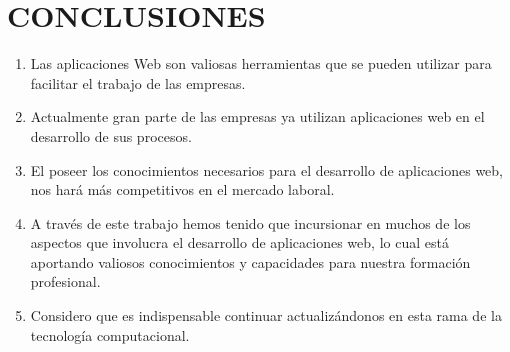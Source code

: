 \chapter*{CONCLUSIONES}
{
	\fontsize{12pt}{10mm}\selectfont
	\begin{enumerate}
		\item Las aplicaciones Web son valiosas herramientas que se pueden utilizar para facilitar el trabajo de las empresas.
		\vspace{6mm}
		
		\item Actualmente gran parte de las empresas ya utilizan aplicaciones web en el desarrollo de sus procesos.
		\vspace{6mm}
		
		\item El poseer los conocimientos necesarios para el desarrollo de aplicaciones web, nos hará más competitivos en el mercado laboral.
		\vspace{6mm}
		
		\item A través de este trabajo hemos tenido que incursionar en muchos de los aspectos que involucra el desarrollo de aplicaciones web, lo cual está aportando valiosos conocimientos y capacidades para nuestra formación profesional.
		\vspace{6mm}
		
		\item Considero que es indispensable continuar actualizándonos en esta rama de la tecnología computacional.
		\vspace{6mm}
	\end{enumerate}
}
